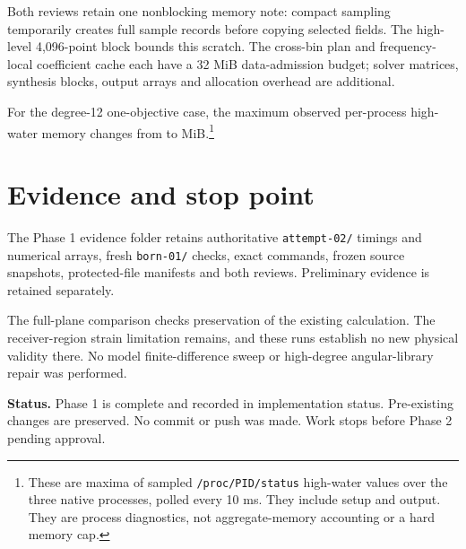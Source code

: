 \documentclass[11pt,a4paper]{article}
\begin{document}
Both reviews retain one nonblocking memory note: compact sampling temporarily creates full sample records before copying selected fields. The high-level 4,096-point block bounds this scratch. The cross-bin plan and frequency-local coefficient cache each have a 32 MiB data-admission budget; solver matrices, synthesis blocks, output arrays and allocation overhead are additional.

For the degree-12 one-objective case, the maximum observed per-process high-water memory changes from \MemoryBefore{} to \MemoryAfter{} MiB.\footnote{These are maxima of sampled \texttt{/proc/PID/status} high-water values over the three native processes, polled every 10 ms. They include setup and output. They are process diagnostics, not aggregate-memory accounting or a hard memory cap.}

\section{Evidence and stop point}
The Phase 1 evidence folder retains authoritative \texttt{attempt-02/} timings and numerical arrays, fresh \texttt{born-01/} checks, exact commands, frozen source snapshots, protected-file manifests and both reviews. Preliminary evidence is retained separately.

The full-plane comparison checks preservation of the existing calculation. The receiver-region strain limitation remains, and these runs establish no new physical validity there. No model finite-difference sweep or high-degree angular-library repair was performed.

\textbf{Status.} Phase 1 is complete and recorded in implementation status. Pre-existing changes are preserved. No commit or push was made. Work stops before Phase 2 pending approval.
\end{document}
